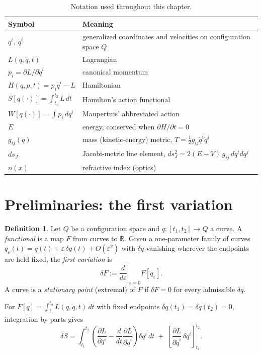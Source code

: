 \documentclass[11pt]{book}
\theoremstyle{definition}
\newtheorem{definition}{Definition}[section]
\theoremstyle{plain}
\theoremstyle{remark}
\begin{document}
\begin{table}[h]
\centering
\renewcommand{\arraystretch}{1.25}
\begin{tabular}{@{}ll@{}}
\toprule
Symbol & Meaning \\
\midrule
$q^i,\ \dot q^i$ & generalized coordinates and velocities on configuration space $Q$ \\
$L(q,\dot q,t)$ & Lagrangian \\
$p_i = \partial L/\partial \dot q^i$ & canonical momentum \\
$H(q,p,t)=p_i\dot q^i - L$ & Hamiltonian \\
$S[q(\cdot)]=\int_{t_1}^{t_2} L\,dt$ & Hamilton's action functional \\
$W[q(\cdot)]=\int p_i\,dq^i$ & Maupertuis' abbreviated action \\
$E$ & energy, conserved when $\partial H/\partial t = 0$ \\
$g_{ij}(q)$ & mass (kinetic-energy) metric, $T=\tfrac12 g_{ij}\dot q^i\dot q^j$ \\
$ds_J$ & Jacobi-metric line element, $ds_J^2 = 2(E-V)\,g_{ij}\,dq^i dq^j$ \\
$n(x)$ & refractive index (optics) \\
\bottomrule
\end{tabular}
\caption{Notation used throughout this chapter.}
\end{table}

\section{Preliminaries: the first variation}

\begin{definition}
Let $Q$ be a configuration space and $q:[t_1,t_2]\to Q$ a curve. A \emph{functional} is a map $F$ from curves to $\mathbb{R}$. Given a one-parameter family of curves $q_\varepsilon(t)=q(t)+\varepsilon\,\delta q(t) + O(\varepsilon^2)$ with $\delta q$ vanishing wherever the endpoints are held fixed, the \emph{first variation} is
\[
\delta F := \left.\frac{d}{d\varepsilon}\right|_{\varepsilon=0} F[q_\varepsilon].
\]
A curve is a \emph{stationary point} (extremal) of $F$ if $\delta F=0$ for every admissible $\delta q$.
\end{definition}

For $F[q]=\int_{t_1}^{t_2} L(q,\dot q,t)\,dt$ with fixed endpoints $\delta q(t_1)=\delta q(t_2)=0$, integration by parts gives
\[
\delta S = \int_{t_1}^{t_2}\left(\frac{\partial L}{\partial q^i}-\frac{d}{dt}\frac{\partial L}{\partial \dot q^i}\right)\delta q^i\,dt
\;+\; \left[\frac{\partial L}{\partial \dot q^i}\,\delta q^i\right]_{t_1}^{t_2}.
\]
\end{document}

